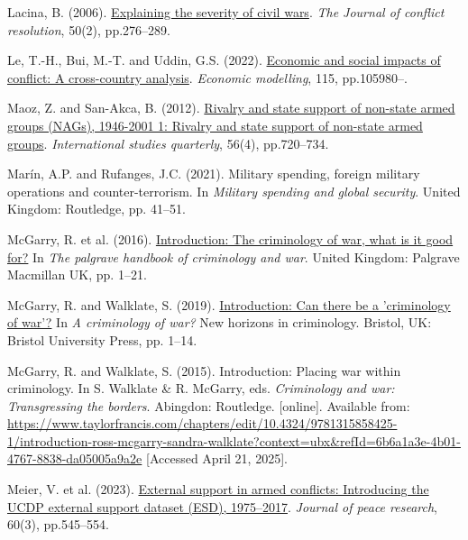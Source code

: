 \documentclass[
]{article}
\newlength{\cslhangindent}
\newenvironment{CSLReferences}[2] %
 {\begin{list}{}{%
  \setlength{\itemindent}{0pt}
  \setlength{\leftmargin}{0pt}
  \setlength{\parsep}{0pt}
  \ifodd #1
   \setlength{\leftmargin}{\cslhangindent}
   \setlength{\itemindent}{-1\cslhangindent}
  \fi
  \setlength{\itemsep}{#2\baselineskip}}}
 {\end{list}}
\begin{document}
\begin{CSLReferences}{0}{1}
Lacina, B. (2006).
\href{https://doi.org/10.1177/0022002705284828}{Explaining the severity
of civil wars}. \emph{The Journal of conflict resolution}, 50(2),
pp.276--289.

Le, T.-H., Bui, M.-T. and Uddin, G.S. (2022).
\href{https://doi.org/10.1016/j.econmod.2022.105980}{Economic and social
impacts of conflict: A cross-country analysis}. \emph{Economic
modelling}, 115, pp.105980--.

Maoz, Z. and San-Akca, B. (2012).
\href{https://doi.org/10.1111/j.1468-2478.2012.00759.x}{Rivalry and
state support of non-state armed groups (NAGs), 1946-2001 1: Rivalry and
state support of non-state armed groups}. \emph{International studies
quarterly}, 56(4), pp.720--734.

Marín, A.P. and Rufanges, J.C. (2021). Military spending, foreign
military operations and counter-terrorism. In \emph{Military spending
and global security}. United Kingdom: Routledge, pp. 41--51.

McGarry, R. et al. (2016).
\href{https://doi.org/10.1057/978-1-137-43170-7_1}{Introduction: The
criminology of war, what is it good for?} In \emph{The palgrave handbook
of criminology and war}. United Kingdom: Palgrave Macmillan UK, pp.
1--21.

McGarry, R. and Walklate, S. (2019).
\href{https://doi.org/10.51952/9781529202618.ch001}{Introduction: Can
there be a 'criminology of war'?} In \emph{A criminology of war?} New
horizons in criminology. Bristol, UK: Bristol University Press, pp.
1--14.

McGarry, R. and Walklate, S. (2015). Introduction: Placing war within
criminology. In S. Walklate \& R. McGarry, eds. \emph{Criminology and
war: Transgressing the borders}. Abingdon: Routledge. {[}online{]}.
Available from:
\url{https://www.taylorfrancis.com/chapters/edit/10.4324/9781315858425-1/introduction-ross-mcgarry-sandra-walklate?context=ubx&refId=6b6a1a3e-4b01-4767-8838-da05005a9a2e}
{[}Accessed April 21, 2025{]}.

Meier, V. et al. (2023).
\href{https://doi.org/10.1177/00223433221079864}{External support in
armed conflicts: Introducing the UCDP external support dataset (ESD),
1975--2017}. \emph{Journal of peace research}, 60(3), pp.545--554.


\end{CSLReferences}
\end{document}

